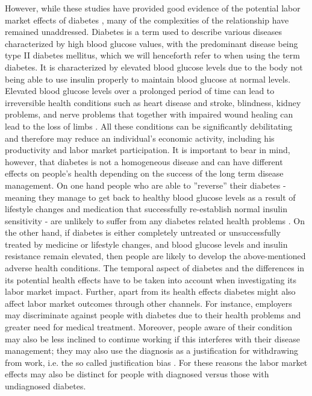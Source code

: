 \documentclass[12pt,english,british]{article}
\begin{document}
However, while these studies have provided good evidence of the potential labor market effects of diabetes , many of the complexities of the relationship have remained unaddressed. Diabetes is a term used to describe  various diseases characterized by high blood glucose values, with the predominant disease being type II diabetes mellitus, which we will henceforth refer to when using the term diabetes. It is characterized by elevated blood glucose levels due to the body not being able to use insulin properly to maintain blood glucose at normal levels. Elevated blood glucose levels over a prolonged period of time can lead to irreversible health conditions such as heart disease and stroke, blindness, kidney problems, and nerve problems that together with impaired wound healing can lead to the loss of limbs \citep{Reynoso-Noveron2011}. All these conditions can be significantly debilitating and therefore may reduce an individual's economic activity, including his productivity and labor market participation. It is important to bear in mind, however, that diabetes is not a homogeneous
disease and can have different effects on people's health depending
on the success of the long term disease management. On one hand people
who are able to ''reverse'' their diabetes - meaning they manage
to get back to healthy blood glucose levels as a result of lifestyle
changes and medication that successfully re-establish normal insulin sensitivity -
are unlikely to suffer from any diabetes related health problems \citep{Lim2011, Gregg2012}.
On the other hand, if diabetes is either completely untreated or unsuccessfully
treated by medicine or lifestyle changes, and blood glucose levels
and insulin resistance remain elevated, then people are likely to develop the above-mentioned adverse health conditions. The temporal aspect of diabetes and the differences in its potential health effects have to be taken into account when investigating its labor market impact. Further, apart from its health effects diabetes might also affect labor market outcomes through other channels. For instance, employers may discriminate against
people with diabetes due to their health problems and greater
need for medical treatment. Moreover, people aware of their condition
may also be less inclined to continue working if this interferes with
their disease management; they may also use the diagnosis as a justification for withdrawing from work, i.e. the so called justification bias \citep{Kapteyn2009}. For these reasons the labor
market effects may also be distinct for people with diagnosed versus those
with undiagnosed diabetes. 
\end{document}
